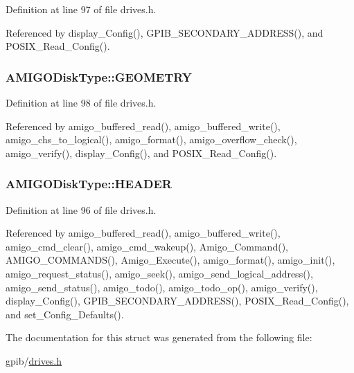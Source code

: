 Definition at line 97 of file drives.\+h.



Referenced by display\+\_\+\+Config(), G\+P\+I\+B\+\_\+\+S\+E\+C\+O\+N\+D\+A\+R\+Y\+\_\+\+A\+D\+D\+R\+E\+S\+S(), and P\+O\+S\+I\+X\+\_\+\+Read\+\_\+\+Config().

\subsubsection[{\texorpdfstring{G\+E\+O\+M\+E\+T\+RY}{GEOMETRY}}]{ A\+M\+I\+G\+O\+Disk\+Type\+::\+G\+E\+O\+M\+E\+T\+RY}\hypertarget{structAMIGODiskType_aa75cfbfabf8081ff7bca08cf87af4da8}{}\label{structAMIGODiskType_aa75cfbfabf8081ff7bca08cf87af4da8}


Definition at line 98 of file drives.\+h.



Referenced by amigo\+\_\+buffered\+\_\+read(), amigo\+\_\+buffered\+\_\+write(), amigo\+\_\+chs\+\_\+to\+\_\+logical(), amigo\+\_\+format(), amigo\+\_\+overflow\+\_\+check(), amigo\+\_\+verify(), display\+\_\+\+Config(), and P\+O\+S\+I\+X\+\_\+\+Read\+\_\+\+Config().

\subsubsection[{\texorpdfstring{H\+E\+A\+D\+ER}{HEADER}}]{ A\+M\+I\+G\+O\+Disk\+Type\+::\+H\+E\+A\+D\+ER}\hypertarget{structAMIGODiskType_a9814efe6f564b104fc7e0100231908a8}{}\label{structAMIGODiskType_a9814efe6f564b104fc7e0100231908a8}


Definition at line 96 of file drives.\+h.



Referenced by amigo\+\_\+buffered\+\_\+read(), amigo\+\_\+buffered\+\_\+write(), amigo\+\_\+cmd\+\_\+clear(), amigo\+\_\+cmd\+\_\+wakeup(), Amigo\+\_\+\+Command(), A\+M\+I\+G\+O\+\_\+\+C\+O\+M\+M\+A\+N\+D\+S(), Amigo\+\_\+\+Execute(), amigo\+\_\+format(), amigo\+\_\+init(), amigo\+\_\+request\+\_\+status(), amigo\+\_\+seek(), amigo\+\_\+send\+\_\+logical\+\_\+address(), amigo\+\_\+send\+\_\+status(), amigo\+\_\+todo(), amigo\+\_\+todo\+\_\+op(), amigo\+\_\+verify(), display\+\_\+\+Config(), G\+P\+I\+B\+\_\+\+S\+E\+C\+O\+N\+D\+A\+R\+Y\+\_\+\+A\+D\+D\+R\+E\+S\+S(), P\+O\+S\+I\+X\+\_\+\+Read\+\_\+\+Config(), and set\+\_\+\+Config\+\_\+\+Defaults().



The documentation for this struct was generated from the following file\+:\begin{DoxyCompactItemize}
\item 
gpib/\hyperlink{drives_8h}{drives.\+h}\end{DoxyCompactItemize}
